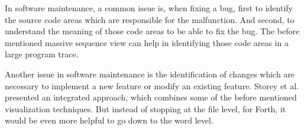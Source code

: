 In software maintenance, a common issue is, when fixing a bug, first to identify the source code areas which are responsible for the malfunction. And second, to understand the meaning of those code areas to be able to fix the bug. The before mentioned massive sequence view can help in identifying those code areas in a large program trace.

Another issue in software maintenance is the identification of changes which are necessary to implement a new feature or modify an existing feature. Storey et al.\cite{Storey:1997:IVT:857188.857642} presented an integrated approach, which combines some of the before mentioned visualization techniques. But instead of stopping at the file level, for Forth, it would be even more helpful to go down to the word level.

\begin{comment}
\begin{itemize}
\item keeping the mental model up to date
\item keeping artifacts up to date
\end{itemize}
\end{comment}

\begin{comment}
\begin{itemize}

\item other data structures and variables should be displayed
	\begin{itemize}
	\item memory maybe like \cite{ReissProgrammingEnvironments1995} or \cite{Aftandilian:2010:HIH:1879211.1879222} but since there is no underlying object orientation and no standardized oo system this would be hard do accomplish
	\end{itemize}

\item interactive program manipulation: state of the system before a word, after a word and by clicking on the word jumping to its definition or inserting it and there also providing those features

\item goal-oriented strategy: the definition of an execution scenario such that only the parts of interest of the software system are analyzed (Koenemann and Robertson, 1991; Zaidman,
2006).

\end{itemize}
\end{comment}